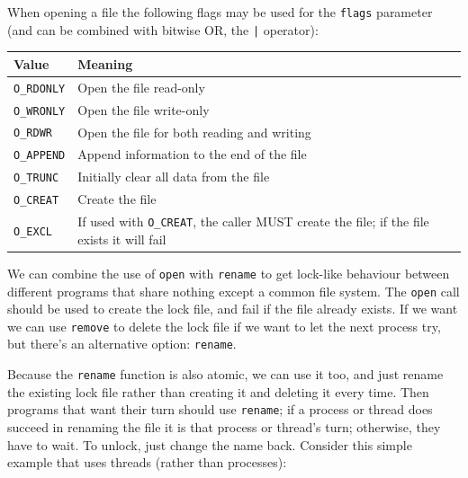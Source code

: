 \documentclass[a4paper]{report}
\begin{document}
When opening a file the following flags may be used for the \texttt{flags} parameter (and can be combined with bitwise OR, the \texttt{|} operator):

\begin{tabular}{l|l}
	\textbf{Value}     & \textbf{Meaning}                                                                                 \\ \hline
	\texttt{O\_RDONLY} & Open the file read-only                                                                          \\ \hline
	\texttt{O\_WRONLY} & Open the file write-only                                                                         \\ \hline
	\texttt{O\_RDWR}   & Open the file for both reading and writing                                                       \\ \hline
	\texttt{O\_APPEND} & Append information to the end of the file                                                        \\ \hline
	\texttt{O\_TRUNC}  & Initially clear all data from the file                                                           \\ \hline
	\texttt{O\_CREAT}  & Create the file                                                                                  \\ \hline
	\texttt{O\_EXCL}   & If used with \texttt{O\_CREAT}, the caller MUST create the file; if the file exists it will fail \\
\end{tabular}

We can combine the use of \texttt{open} with \texttt{rename} to get lock-like behaviour between different programs that share nothing except a common file system. The \texttt{open} call should be used to create the lock file, and fail if the file already exists. If we want we can use \texttt{remove} to delete the lock file if we want to let the next process try, but there's an alternative option: \texttt{rename}.

Because the \texttt{rename} function is also atomic, we can use it too, and just rename the existing lock file rather than creating it and deleting it every time. Then programs that want their turn should use \texttt{rename}; if a process or thread does succeed in renaming the file it is that process or thread's turn; otherwise, they have to wait. To unlock, just change the name back. Consider this simple example that uses threads (rather than processes):
\end{document}
